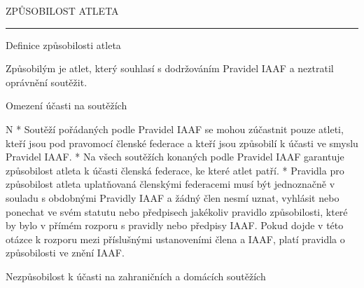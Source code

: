 \chap ZPŮSOBILOST ATLETA

\rule{19}
\secc Definice způsobilosti atleta

Způsobilým je atlet, který souhlasí s dodržováním Pravidel IAAF a neztratil oprávnění soutěžit.

\secc Omezení  účasti na soutěžích

\begitems \style N
* Soutěží pořádaných podle Pravidel IAAF se mohou zúčastnit pouze atleti, kteří jsou pod pravomocí členské federace a kteří jsou způsobilí k účasti ve smyslu Pravidel IAAF.
* Na všech soutěžích konaných podle Pravidel IAAF garantuje způsobilost atleta k účasti členská federace, ke které atlet patří.
* Pravidla pro způsobilost atleta uplatňovaná členskými federacemi musí být jednoznačně v souladu s obdobnými Pravidly IAAF a žádný člen nesmí uznat, vyhlásit nebo ponechat ve svém statutu nebo předpisech jakékoliv pravidlo způsobilosti, které by bylo v přímém rozporu s pravidly nebo předpisy IAAF. Pokud dojde v této otázce k rozporu mezi příslušnými ustanoveními člena a IAAF, platí pravidla o způsobilosti ve znění IAAF.
\enditems

\secc Nezpůsobilost k účasti na zahraničních a domácích soutěžích


